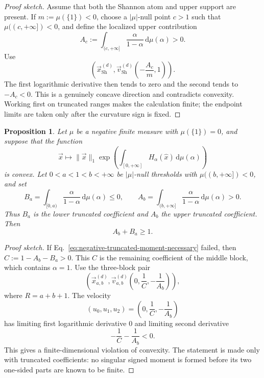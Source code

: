 \documentclass[aps,pra,11pt,onecolumn,nofootinbib,tightenlines]{revtex4-2}
\newtheorem{proposition}[theorem]{Proposition}
\theoremstyle{definition}
\def\d{\mathrm{d}}
\begin{document}
\begin{proof}[Proof sketch]
Assume that both the Shannon atom and upper support are present.  If
$m:=\mu(\{1\})<0$, choose a $|\mu|$-null point $c>1$ such that
$\mu((c,+\infty])<0$, and define the localized upper contribution
\[
A_c:=\int_{(c,+\infty]}
\frac{\alpha}{1-\alpha}\,\d\mu(\alpha)>0.
\]
Use
\begin{equation}
\left(
\vec{x}_{\mathrm{Sh}}^{(d)},
\vec{v}_{\mathrm{Sh}}^{(d)}\!\left(-\frac{A_c}{m},1\right)
\right).
\label{eq:negative-Shannon-witness-pair}
\end{equation}
The first logarithmic derivative then tends to zero and the second tends to
$-A_c<0$.  This is a
genuinely concave direction and contradicts convexity.  Working first on
truncated ranges makes the calculation finite; the endpoint limits are taken only
after the curvature sign is fixed.
\end{proof}

\begin{proposition}
\label{prop:second-measure}
Let $\mu$ be a negative finite measure with $\mu(\{1\})=0$, and suppose that the
function
\begin{equation}
\vec{x}\longmapsto\|\vec{x}\|_1
\exp\!\left(\int_{[0,+\infty]}H_\alpha(\hat{x})\,
\d\mu(\alpha)\right)
\end{equation}
is convex.  Let $0<a<1<b<+\infty$ be $|\mu|$-null thresholds with
$\mu((b,+\infty])<0$, and set
\begin{equation}
B_a=\int_{[0,a)}\frac{\alpha}{1-\alpha}\,\d\mu(\alpha)\leq0,
\qquad
A_b=\int_{(b,+\infty]}\frac{\alpha}{1-\alpha}\,\d\mu(\alpha)>0.
\end{equation}
Thus $B_a$ is the lower truncated coefficient and $A_b$ the upper truncated
coefficient.
Then
\begin{equation}
\label{eq:negative-truncated-moment-necessary}
A_b+B_a\geq1.
\end{equation}
\end{proposition}

\begin{proof}[Proof sketch]
If Eq.~\eqref{eq:negative-truncated-moment-necessary} failed, then
$C:=1-A_b-B_a>0$.  This $C$ is the remaining coefficient of the middle
block, which contains $\alpha=1$.  Use the three-block pair
\begin{equation}
\left(
\vec{x}_{a,b}^{(d)},
\vec{v}_{a,b}^{(d)}\!\left(0,\frac1C,-\frac1{A_b}\right)
\right),
\label{eq:negative-moment-witness-pair}
\end{equation}
where $R=a+b+1$.  The velocity
\[
(u_0,u_1,u_2)=\left(0,\frac1C,-\frac1{A_b}\right)
\]
has limiting first logarithmic derivative $0$ and limiting second derivative
\[
-\frac1C-\frac1{A_b}<0.
\]
This gives a finite-dimensional violation of convexity.  The statement is made
only with truncated coefficients: no singular signed moment is formed before
its two one-sided parts are known to be finite.
\end{proof}
\end{document}
